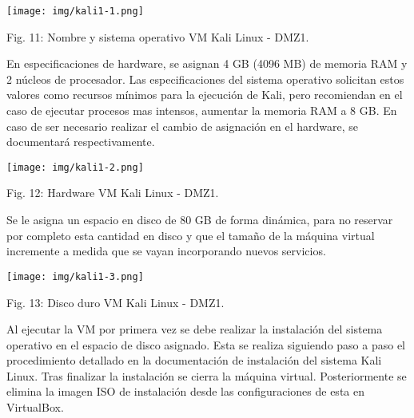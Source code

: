 \documentclass[12pt,oneside,a4paper]{book}
\begin{document}
\vspace{2em}

\begin{center}
    \texttt{[image: img/kali1-1.png]}
    
\vspace{0.1em}
    
    Fig. 11: Nombre y sistema operativo VM Kali Linux - DMZ1.
\end{center}

\vspace{2em}

\hspace{20pt}
En especificaciones de hardware, se asignan 4 GB (4096 MB) de memoria RAM y 2 núcleos de procesador. Las especificaciones del sistema operativo solicitan estos valores como recursos mínimos para la ejecución de Kali, pero recomiendan en el caso de ejecutar procesos mas intensos, aumentar la memoria RAM a 8 GB. En caso de ser necesario realizar el cambio de asignación en el hardware, se documentará respectivamente.

\vspace{2em}

\begin{center}
    \texttt{[image: img/kali1-2.png]}
    
\vspace{0.1em}
    
    Fig. 12: Hardware VM Kali Linux - DMZ1.
\end{center}

\vspace{2em}

\hspace{20pt}
Se le asigna un espacio en disco de 80 GB de forma dinámica, para no reservar por completo esta cantidad en disco y que el tamaño de la máquina virtual incremente a medida que se vayan incorporando nuevos servicios.

\vspace{2em}

\begin{center}
    \texttt{[image: img/kali1-3.png]}
    
\vspace{0.1em}
    
    Fig. 13: Disco duro VM Kali Linux - DMZ1.
\end{center}

\vspace{2em}

\hspace{20pt}
Al ejecutar la VM por primera vez se debe realizar la instalación del sistema operativo en el espacio de disco asignado. Esta se realiza siguiendo paso a paso el procedimiento detallado en la documentación de instalación del sistema Kali Linux. Tras finalizar la instalación se cierra la máquina virtual. Posteriormente se elimina la imagen ISO de instalación desde las configuraciones de esta en VirtualBox.
\end{document}
